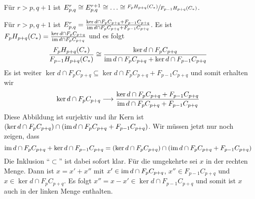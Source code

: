 \begin{lemma}
	Für $r>p,q+1$ ist $E^r_{p,q} \cong E^{r+1}_{p,q} \cong \ldots \cong \sfrac{F_p H_{p+q}(C_*)}{F_{p-1} H_{p+q}(C_*)}$.
\end{lemma}
\begin{beweis}
	Für $r>p,q+1$ ist $E^r_{p,q} = \frac{\ker d \cap F_p C_{p+q} + F_{p-1}C_{p+q}}{\im d \cap F_p C_{p+q} + F_{p-1} C_{p+q}}$.
	Es ist $F_p H_{p+q}(C_*) = \frac{\ker d \cap F_p C_{p+q}}{\im d  \cap F_p C_{p+q}}$ und es folgt
	\[
		\frac{F_p H_{p+q}(C_*)}{F_{p-1} H_{p+q}(C_*)} \cong \frac{\ker d \cap F_p C_{p+q}}{ \im d \cap F_p C_{p+q} + \ker d \cap F_{p-1}C_{p+q}} 
	\]
	Es ist weiter $\ker d \cap F_p C_{p+q} \subseteq \ker d \cap F_p C_{p+q} + F_{p-1} C_{p+q}$ und somit erhalten wir 
	\[
		\ker d \cap F_p C_{p+q} \longrightarrow \frac{\ker d \cap F_p C_{p+q} + F_{p-1}C_{p+q}}{\im d \cap F_p C_{p+q} + F_{p-1} C_{p+q}}
	\]
	Diese Abbildung ist surjektiv und ihr Kern ist $\enbrace*{\ker d \cap F_p C_{p+q}} \cap \enbrace*{\im d \cap F_p C_{p+q} + F_{p-1} C_{p+q}}$.
	Wir müssen jetzt nur noch zeigen, dass 
	\[
		\im d \cap F_p C_{p+q} + \ker d \cap F_{p-1}C_{p+q}=\enbrace*{\ker d \cap F_p C_{p+q}} \cap \enbrace*{\im d \cap F_p C_{p+q} + F_{p-1} C_{p+q}}
	\]
	Die Inklusion \enquote{$\subset$} ist dabei sofort klar. Für die umgekehrte sei $x$ in der rechten Menge.
	Dann ist $x=x' + x''$ mit $x' \in \im d \cap F_p C_{p+q}$, $x'' \in F_{p-1} C_{p+q}$ und $x \in \ker d \cap F_p C_{p+q}$.
	Es folgt $x''=x-x' \in \ker d \cap F_{p-1} C_{p+q}$ und somit ist $x$ auch in der linken Menge enthalten.
\end{beweis}


